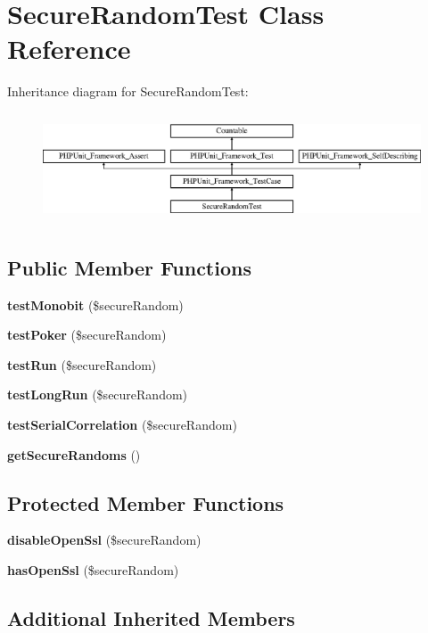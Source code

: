 \section{Secure\+Random\+Test Class Reference}
\label{class_symfony_1_1_component_1_1_security_1_1_core_1_1_tests_1_1_util_1_1_secure_random_test}
Inheritance diagram for Secure\+Random\+Test\+:\begin{figure}[H]
\begin{center}
\leavevmode
\includegraphics[height=3.303835cm]{class_symfony_1_1_component_1_1_security_1_1_core_1_1_tests_1_1_util_1_1_secure_random_test}
\end{center}
\end{figure}
\subsection*{Public Member Functions}
\begin{DoxyCompactItemize}
\item 
{\bf test\+Monobit} (\$secure\+Random)
\item 
{\bf test\+Poker} (\$secure\+Random)
\item 
{\bf test\+Run} (\$secure\+Random)
\item 
{\bf test\+Long\+Run} (\$secure\+Random)
\item 
{\bf test\+Serial\+Correlation} (\$secure\+Random)
\item 
{\bf get\+Secure\+Randoms} ()
\end{DoxyCompactItemize}
\subsection*{Protected Member Functions}
\begin{DoxyCompactItemize}
\item 
{\bf disable\+Open\+Ssl} (\$secure\+Random)
\item 
{\bf has\+Open\+Ssl} (\$secure\+Random)
\end{DoxyCompactItemize}
\subsection*{Additional Inherited Members}


